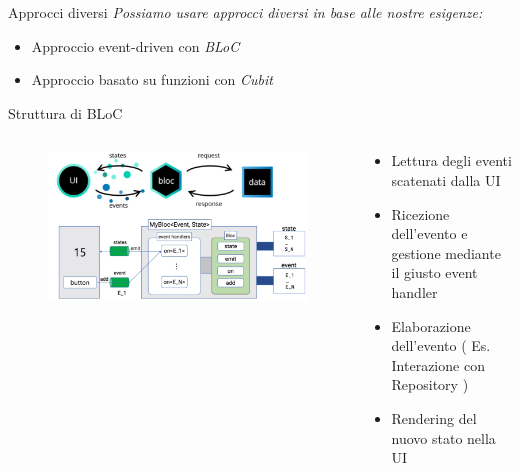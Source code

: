 \documentclass{../libs/presentation_format}
\begin{document}

\begin{frame}{Approcci diversi}
	\emph{Possiamo usare approcci diversi in base alle nostre esigenze:}
	\begin{itemize}
		\item Approccio event-driven con \emph{BLoC}
		\item Approccio basato su funzioni con \emph{Cubit}
	\end{itemize}
\end{frame}


\begin{frame}{Struttura di BLoC}
	\begin{minipage}[0.2\textheight]{\textwidth}
		\begin{columns}[T]
			\begin{column}{0.4\textwidth}
				\begin{figure}[htpb]
					\centering
					\includegraphics[scale=0.15]{../libs/bloc-structure}
				\end{figure}
			\end{column}
			\begin{column}{0.6\textwidth}
				\begin{itemize}
					\item Lettura degli eventi scatenati dalla UI
					\item Ricezione dell'evento e gestione mediante il giusto event handler
					\item Elaborazione dell'evento ( Es. Interazione con Repository )
					\item Rendering del nuovo stato nella UI
				\end{itemize}
			\end{column}
		\end{columns}
	\end{minipage}
\end{frame}
\end{document}
